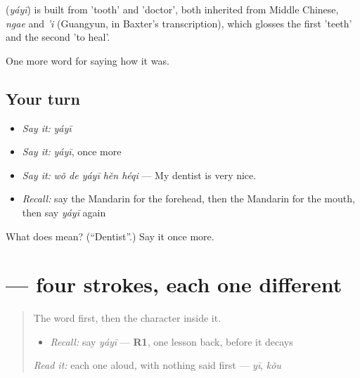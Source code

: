 \begin{cousinweb}
\textbf{} (\emph{yáyī}) is built from  'tooth' and  'doctor', both inherited from Middle Chinese, \emph{ngae} and \emph{'i} (Guangyun, in Baxter's transcription), which glosses the first 'teeth' and the second 'to heal'.
\end{cousinweb}

\begin{grammarlens}[title={What you've built}]
One more word for saying how it was.
\end{grammarlens}

\subsection*{Your turn}
\begin{itemize}
\raggedright
  \item \emph{Say it:} \emph{yáyī}
  \item \emph{Say it:} \emph{yáyī}, once more
  \item \emph{Say it:} \emph{wǒ de yáyī hěn héqi} — My dentist is very nice.
  \item \emph{Recall:} say the Mandarin for the forehead, then the Mandarin for the mouth, then say \emph{yáyī} again
\end{itemize}

\begin{tcolorbox}[breakable,colback=teal!4,colframe=teal!35!black,title={Before you move on}]
What does  mean? (\textquotedblleft{}Dentist\textquotedblright{}.) Say it once more.
\end{tcolorbox}
\section[\texorpdfstring{\zh{牙} (yá)}{牙 (yá)}]{ — four strokes, each one different}

\label{lesson:ZH-W473-ya-tooth}



\begin{quote}
The word first, then the character inside it.

\begin{itemize}
\raggedright
  \item \emph{Recall:} say \emph{yáyī} — \textbf{R1}, one lesson back, before it decays
\end{itemize}

\begin{quote}
 
\end{quote}

\emph{Read it:} each one aloud, with nothing said first — \emph{yī}, \emph{kǒu}
\end{quote}

